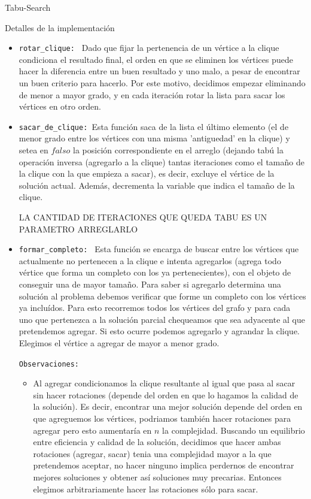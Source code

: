 \begin{section}{Tabu-Search}
\begin{subsection}{Detalles de la implementación}
		\begin{itemize}			
			\item \texttt{rotar\_clique: } Dado que fijar la pertenencia de un vértice a la clique condiciona el resultado final, el orden en que se eliminen los vértices puede hacer la diferencia entre un buen resultado y uno malo, a pesar de encontrar un buen criterio para hacerlo. Por este motivo, decidimos empezar eliminando de menor a mayor grado, y en cada iteración rotar la lista para sacar los vértices en otro orden.
			
			\item \texttt{sacar\_de\_clique: }Esta función saca de la lista el último elemento (el de menor grado entre los vértices con una misma 'antiguedad' en la clique) y setea en $falso$ la posición correspondiente en el arreglo (dejando tabú la operación inversa (agregarlo a la clique) tantas iteraciones como el tamaño de la clique con la que empieza a sacar), es decir, excluye el vértice de la solución actual. Además, decrementa la variable que indica el tamaño de la clique.

			LA CANTIDAD DE ITERACIONES QUE QUEDA TABU ES UN PARAMETRO ARREGLARLO
			
			\item \texttt{formar\_completo: } Esta función se encarga de buscar entre los vértices que actualmente no pertenecen a la clique e intenta agregarlos (agrega todo vértice que forma un completo con los ya pertenecientes), con el objeto de conseguir una de mayor tamaño. Para saber si agregarlo determina una solución al problema debemos verificar que forme un completo con los vértices ya incluídos. Para esto recorremos todos los vértices del grafo y para cada uno que pertenezca a la solución parcial chequeamos que sea adyacente al que pretendemos agregar. Si esto ocurre podemos agregarlo y agrandar la clique. Elegimos el vértice a agregar de mayor a menor grado.
			
			\texttt{Observaciones: }
			\begin{itemize}
				\item Al agregar condicionamos la clique resultante al igual que pasa al sacar sin hacer rotaciones (depende del orden en que lo hagamos la calidad de la solución). Es decir, encontrar una mejor solución depende del orden en que agreguemos los vértices, podriamos también hacer rotaciones para agregar pero esto aumentaría en $n$ la complejidad. Buscando un equilibrio entre eficiencia y calidad de la solución, decidimos que hacer ambas rotaciones (agregar, sacar) tenia una complejidad mayor a la que pretendemos aceptar, no hacer ninguno implica perdernos de encontrar mejores soluciones y obtener así soluciones muy precarias. Entonces elegimos arbitrariamente hacer las rotaciones sólo para sacar.


\end{itemize}
\end{itemize}
\end{subsection}
\end{section}
